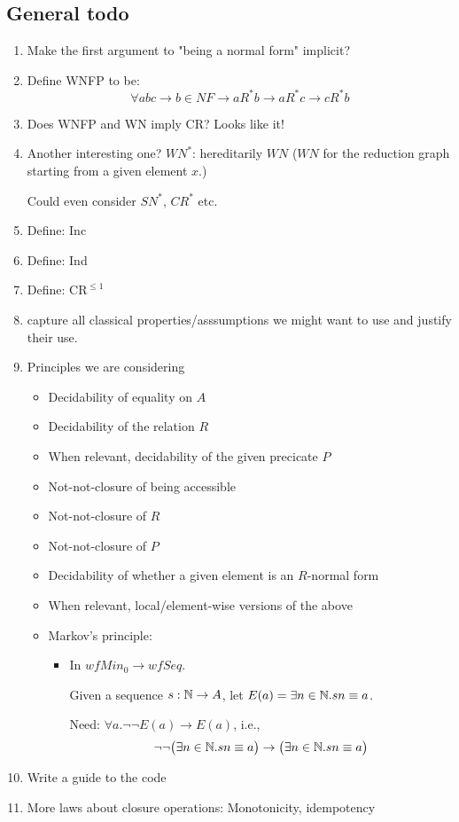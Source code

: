 \documentclass{scrartcl}
\begin{document}
\subsection*{General todo}
\begin{enumerate}

  \item  Make the first argument to "being a normal form" implicit?
  \item Define WNFP to be:
  \[\forall a b c \to b \in NF \to a R^* b \to a R^* c \to c R^* b \]
  \item Does WNFP and WN imply CR?  Looks like it!
  \item  Another interesting one? $WN^*$: hereditarily $WN$ ($WN$ for the reduction graph starting from a given element $x$.)

  Could even consider $SN^*$, $CR^*$ etc.
  \item Define: Inc
  \item Define: Ind
  \item Define: $\mathrm{CR}^{\le 1}$
  \item capture all classical properties/asssumptions we might want to use and justify their use.
  \item Principles we are considering
  \begin{itemize}
    \item Decidability of equality on $A$
    \item Decidability of the relation $R$
    \item When relevant, decidability of the given precicate $P$
    \item Not-not-closure of being accessible
    \item Not-not-closure of $R$
    \item Not-not-closure of $P$
    \item Decidability of whether a given element is an $R$-normal form
    \item When relevant, local/element-wise versions of the above
    \item Markov's principle:
    \begin{itemize}
      \item In $wfMin_0 \to wfSeq$.

      Given a sequence $s : \mathbb{N} \to A$, let $E(a) = \exists n \in \mathbb{N}. s n \equiv a$.

      Need: $\forall a. \lnot\lnot E(a) \to E(a)$, i.e.,
      \[\lnot\lnot \big(\exists n \in \mathbb{N}. s n \equiv a\big)
            \to \big(\exists n \in \mathbb{N}. s n \equiv a\big)\]

    \end{itemize}
  \end{itemize}
  \item Write a guide to the code
  \item More laws about closure operations: Monotonicity, idempotency

\end{enumerate}
\newpage
\end{document}
